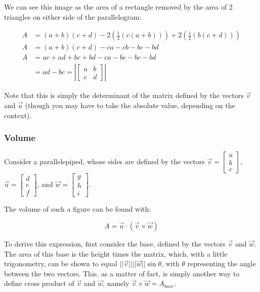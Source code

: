 \documentclass[12pt]{article}
\begin{document}
{We can see this image as the area of a rectangle removed by the area of 2 triangles on either side of the parallelogram:

\begin{equation}
    \begin{split}
    A &= (a+b)(c+d) - 2 (\frac{1}{2}(c(a+b))) + 2(\frac{1}{2}(b(c+d)))\\
    A &= (a+b)(c+d) - ca - cb - bc - bd\\
    A &= ac + ad + bc + bd - ca - bc - bc - bd\\
    &= ad - bc = |\begin{bmatrix}
        a & b\\
        c & d
        \end{bmatrix}|
    \end{split}
\end{equation}

Note that this is simply the determinant of the matrix defined by the vectors $\vec{v}$ and $\vec{u}$ (though you may have to take the absolute value, depending on the context).

\subsubsection{Volume}

Consider a parallelepiped, whose sides are defined by the vectors $\vec{v} = \begin{bmatrix}
    a\\
    b\\
    c
\end{bmatrix}$, $\vec{u} = \begin{bmatrix}
    d\\
    e\\
    f
\end{bmatrix}$, and $\vec{w} = \begin{bmatrix}
    g\\
    h\\
    i
\end{bmatrix}$.

The volume of such a figure can be found with:

\[
    A = \vec{u} \cdot (\vec{v}\times \vec{w})
    \]

To derive this expression, first consider the base, defined by the vectors $\vec{v}$ and $\vec{w}$. The area of this base is the height times the matrix, which, with a little trigonometry, can be shown to equal $||\vec{v}||||\vec{w}||\sin \theta$, with $\theta$ representing the angle between the two vectors. This, as a matter of fact, is simply another way to define cross product of $\vec{v}$ and $\vec{w}$, namely $\vec{v}\times\vec{w} = A_{base}$.

}
\end{document}
